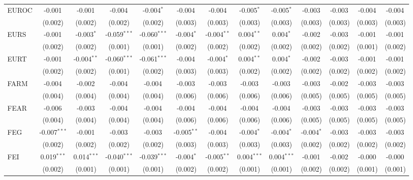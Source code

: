 \begin{table}[!htbp]
\begin{tabular}{@{\extracolsep{5pt}}lcccccccccccc}
 EUROC & -0.001$^{}$ & -0.001$^{}$ & -0.004$^{}$ & -0.004$^{*}$ & -0.004$^{}$ & -0.004$^{}$ & -0.005$^{*}$ & -0.005$^{*}$ & -0.003$^{}$ & -0.003$^{}$ & -0.004$^{}$ & -0.004$^{}$ \\
  & (0.002) & (0.002) & (0.002) & (0.002) & (0.003) & (0.003) & (0.003) & (0.003) & (0.003) & (0.003) & (0.003) & (0.003) \\
 EURS & -0.001$^{}$ & -0.003$^{*}$ & -0.059$^{***}$ & -0.060$^{***}$ & -0.004$^{*}$ & -0.004$^{**}$ & 0.004$^{**}$ & 0.004$^{*}$ & -0.002$^{}$ & -0.003$^{}$ & -0.001$^{}$ & -0.001$^{}$ \\
  & (0.002) & (0.002) & (0.001) & (0.001) & (0.002) & (0.002) & (0.002) & (0.002) & (0.002) & (0.002) & (0.001) & (0.002) \\
 EURT & -0.001$^{}$ & -0.004$^{**}$ & -0.060$^{***}$ & -0.061$^{***}$ & -0.004$^{}$ & -0.004$^{*}$ & 0.004$^{**}$ & 0.004$^{*}$ & -0.002$^{}$ & -0.003$^{}$ & -0.001$^{}$ & -0.001$^{}$ \\
  & (0.002) & (0.002) & (0.001) & (0.002) & (0.003) & (0.003) & (0.002) & (0.002) & (0.002) & (0.002) & (0.002) & (0.002) \\
 FARM & -0.004$^{}$ & -0.002$^{}$ & -0.004$^{}$ & -0.004$^{}$ & -0.003$^{}$ & -0.003$^{}$ & -0.003$^{}$ & -0.003$^{}$ & -0.003$^{}$ & -0.002$^{}$ & -0.003$^{}$ & -0.003$^{}$ \\
  & (0.004) & (0.004) & (0.004) & (0.004) & (0.006) & (0.006) & (0.006) & (0.006) & (0.005) & (0.005) & (0.005) & (0.005) \\
 FEAR & -0.006$^{}$ & -0.003$^{}$ & -0.004$^{}$ & -0.004$^{}$ & -0.004$^{}$ & -0.004$^{}$ & -0.004$^{}$ & -0.004$^{}$ & -0.003$^{}$ & -0.003$^{}$ & -0.003$^{}$ & -0.003$^{}$ \\
  & (0.004) & (0.004) & (0.004) & (0.004) & (0.006) & (0.006) & (0.006) & (0.006) & (0.005) & (0.005) & (0.005) & (0.005) \\
 FEG & -0.007$^{***}$ & -0.001$^{}$ & -0.003$^{}$ & -0.003$^{}$ & -0.005$^{**}$ & -0.004$^{}$ & -0.004$^{*}$ & -0.004$^{*}$ & -0.004$^{*}$ & -0.003$^{}$ & -0.003$^{}$ & -0.003$^{}$ \\
  & (0.002) & (0.002) & (0.002) & (0.002) & (0.003) & (0.003) & (0.003) & (0.003) & (0.002) & (0.002) & (0.002) & (0.002) \\
 FEI & 0.019$^{***}$ & 0.014$^{***}$ & -0.040$^{***}$ & -0.039$^{***}$ & -0.004$^{*}$ & -0.005$^{**}$ & 0.004$^{***}$ & 0.004$^{***}$ & -0.001$^{}$ & -0.002$^{}$ & -0.000$^{}$ & -0.000$^{}$ \\
  & (0.002) & (0.001) & (0.001) & (0.001) & (0.002) & (0.002) & (0.001) & (0.001) & (0.002) & (0.002) & (0.001) & (0.001) \\

\end{tabular}
\end{table}
